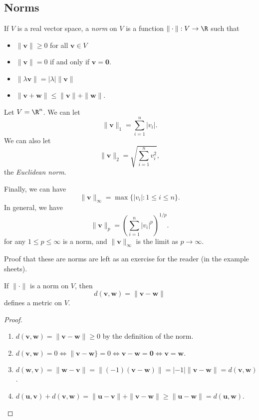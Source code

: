 \documentclass[a4paper]{article}
\begin{document}
\subsection{Norms}
\begin{defi}[Norm]
  If $V$ is a real vector space, a \emph{norm} on $V$ is a function $\|\cdot \|: V\to \R$ such that
  \begin{itemize}
    \item $\|\mathbf{v}\| \geq 0$ for all $\mathbf{v}\in V$
    \item $\|\mathbf{v}\| = 0$ if and only if $\mathbf{v} = \mathbf{0}$.
    \item $\|\lambda \mathbf{v}\| = |\lambda|\|\mathbf{v}\|$
    \item $\|\mathbf{v} + \mathbf{w}\| \leq \|\mathbf{v}\| + \|\mathbf{w}\|$.
  \end{itemize}
\end{defi}

\begin{eg}
  Let $V = \R^n$. We can let
  \[
    \|\mathbf{v}\|_1 = \sum_{i = 1}^n  |v_i|.
  \]
  We can also let
  \[
    \|\mathbf{v}\|_2 = \sqrt{\sum_{i = 1}^n v_i^2},
  \]
  the \emph{Euclidean norm}.

  Finally, we can have
  \[
    \|\mathbf{v}\|_\infty = \max \{|v_i|: 1 \leq i \leq n\}.
  \]
  In general, we have
  \[
    \|\mathbf{v}\|_p = \left(\sum_{i = 1}^n |v_i|^p\right)^{1/p}.
  \]
  for any $1 \leq p \leq \infty$ is a norm, and $\|\mathbf{v}\|_\infty$ is the limit as $p\to \infty$. 

  Proof that these are norms are left as an exercise for the reader (in the example sheets).
\end{eg}

\begin{lemma}
  If $\|\cdot\|$ is a norm on $V$, then
  \[
    d(\mathbf{v}, \mathbf{w}) = \|\mathbf{v} - \mathbf{w}\|
  \]
  defines a metric on $V$.
\end{lemma}

\begin{proof}\leavevmode
  \begin{enumerate}
    \item $d(\mathbf{v}, \mathbf{w}) = \|\mathbf{v} - \mathbf{w}\| \geq 0$ by the definition of the norm.
    \item $d(\mathbf{v}, \mathbf{w}) = 0 \Leftrightarrow \|\mathbf{v} - \mathbf{w}\} = 0 \Leftrightarrow \mathbf{v} - \mathbf{w} = \mathbf{0} \Leftrightarrow \mathbf{v} = \mathbf{w}$.
    \item $d(\mathbf{w}, \mathbf{v}) = \|\mathbf{w} - \mathbf{v}\| = \|(-1)(\mathbf{v} - \mathbf{w})\| = |-1| \|\mathbf{v} - \mathbf{w}\| = d(\mathbf{v}, \mathbf{w})$.
    \item $d(\mathbf{u}, \mathbf{v}) + d(\mathbf{v}, \mathbf{w}) = \|\mathbf{u} - \mathbf{v}\| + \|\mathbf{v} - \mathbf{w}\| \geq \|\mathbf{u} - \mathbf{w}\| = d(\mathbf{u}, \mathbf{w})$.
  \end{enumerate}
\end{proof}
\end{document}

